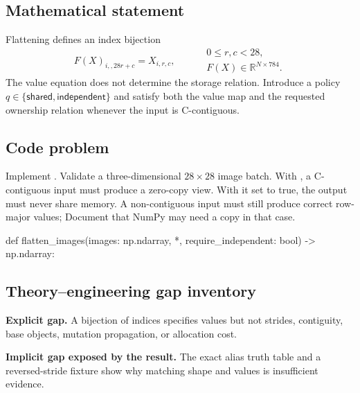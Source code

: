 
        \subsection{Mathematical statement}


Flattening defines an index bijection
\[
  F(X)_{i,,28r+c}=X_{i,r,c},
  \qquad
  \begin{aligned}
  &0\le r,c<28,\\[-0.2em]
  &F(X)\in\mathbb R^{N\times 784}.
  \end{aligned}
\]
The value equation does not determine the storage relation.  Introduce a policy
$q\in\{\mathsf{shared},\mathsf{independent}\}$ and satisfy both the value map and
the requested ownership relation whenever the input is C-contiguous.


        \subsection{Code problem}


Implement .  Validate a three-dimensional $28\times28$
image batch.  With , a C-contiguous input must
produce a zero-copy view.  With it set to true, the output must never share
memory.  A non-contiguous input must still produce correct row-major values;
\newline Document that NumPy may need a copy in that case.


        \begin{contractbox}
        \begin{Code}
        def flatten_images(images: np.ndarray, *, require_independent: bool) -> np.ndarray:
        \end{Code}
        \end{contractbox}

        \subsection{Theory--engineering gap inventory}

        \begin{gapbox}
        \textbf{Explicit gap.} A bijection of indices specifies values but not strides, contiguity, base objects, mutation propagation, or allocation cost.

        \textbf{Implicit gap exposed by the result.} The exact alias truth table and a reversed-stride fixture show why matching shape and values is insufficient evidence.
        \end{gapbox}

